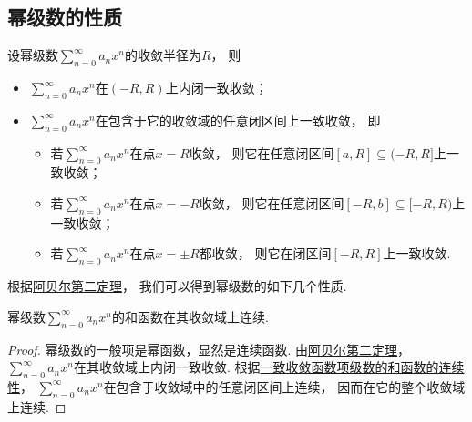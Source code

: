 \subsection{幂级数的性质}
\begin{theorem}[阿贝尔第二定理]\label{theorem:无穷级数.阿贝尔定理2}
设幂级数\(\sum_{n=0}^\infty a_n x^n\)的收敛半径为\(R\)，
则\begin{itemize}
	\item \(\sum_{n=0}^\infty a_n x^n\)在\((-R,R)\)上内闭一致收敛；
	\item \(\sum_{n=0}^\infty a_n x^n\)在包含于它的收敛域的任意闭区间上一致收敛，
	即\begin{itemize}
		\item 若\(\sum_{n=0}^\infty a_n x^n\)在点\(x=R\)收敛，
		则它在任意闭区间\([a,R]\subseteq(-R,R]\)上一致收敛；
		\item 若\(\sum_{n=0}^\infty a_n x^n\)在点\(x=-R\)收敛，
		则它在任意闭区间\([-R,b]\subseteq[-R,R)\)上一致收敛；
		\item 若\(\sum_{n=0}^\infty a_n x^n\)在点\(x=\pm R\)都收敛，
		则它在闭区间\([-R,R]\)上一致收敛.
	\end{itemize}
\end{itemize}
\end{theorem}

根据\hyperref[theorem:无穷级数.阿贝尔定理2]{阿贝尔第二定理}，
我们可以得到幂级数的如下几个性质.

\begin{property}\label{theorem:无穷级数.幂级数的和函数的性质1}
幂级数\(\sum_{n=0}^\infty a_n x^n\)的和函数在其收敛域上连续.
\begin{proof}
幂级数的一般项是幂函数，显然是连续函数.
由\hyperref[theorem:无穷级数.阿贝尔定理2]{阿贝尔第二定理}，
\(\sum_{n=0}^\infty a_n x^n\)在其收敛域上内闭一致收敛.
根据\hyperref[theorem:函数项级数.连续函数项级数的内闭一致收敛性保证和函数的连续性]{一致收敛函数项级数的和函数的连续性}，
\(\sum_{n=0}^\infty a_n x^n\)在包含于收敛域中的任意闭区间上连续，
因而在它的整个收敛域上连续.
\end{proof}
\end{property}

